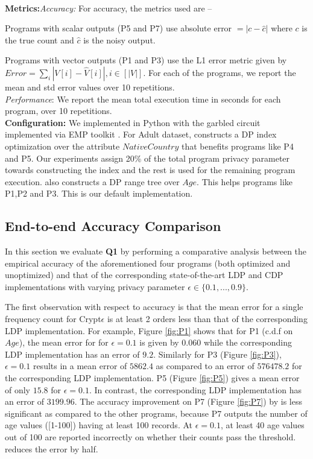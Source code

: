\\\textbf{Metrics:}\textit{Accuracy:} For accuracy, the  metrics used are --
\squishlist \item Programs with scalar outputs (P5 and P7) use absolute error $ =|c-\hat{c}|$ where $c$ is the true count and $\hat{c}$ is the noisy output.\item Programs with vector outputs (P1 and P3) use the L1 error metric given  by $Error=\sum_{i}|V[i]-\hat{V}[i]|, i \in [|V|]$.
\squishend
For each of the programs, we report the mean and std error values over 10 repetitions.
\\\textit{Performance}: We report the mean total execution time in seconds for each program, over 10 repetitions.
\\\textbf{Configuration:} We implemented \system in Python with the garbled circuit implemented via EMP
toolkit \cite{EMP}. %
For Adult dataset, \system constructs a DP index optimization over
the attribute $NativeCountry$ that benefits programs like P4 and P5. Our experiments assign
20\% of the total program privacy parameter towards constructing the index
and the rest is used for the remaining program execution. \system also constructs a DP range tree over $Age$. This helps programs like P1,P2 and P3. This is our default \system implementation. 
\subsection{End-to-end Accuracy Comparison}
In this section we evaluate \textbf{Q1} by performing a comparative analysis between the empirical accuracy of the aforementioned four \system programs (both optimized and unoptimized) and that of the corresponding state-of-the-art \textsf{LDP} \cite{LDP1} and \textsf{CDP} \cite{Dork} implementations  with varying privacy parameter $\epsilon \in \{0.1,...,0.9\}$. %

The first observation with respect to accuracy is that the mean error for a single frequency count for Crypt$\epsilon$ is at least 2 orders less than that of the corresponding \textsf{LDP} implementation.   For example, Figure \ref{fig:P1} shows that for P1 (c.d.f on $Age$), the mean error for \system for $\epsilon=0.1$ is given by $0.060$ while the corresponding \textsf{LDP} implementation has an error of $9.2$. Similarly for P3 (Figure \ref{fig:P3}),  $\epsilon=0.1$ results in a mean error of $5862.4$ as compared to an error of $576478.2$ for the corresponding \textsf{LDP} implementation. P5 (Figure \ref{fig:P5}) gives a mean error of only $15.8$ for $\epsilon=0.1$. In contrast, the corresponding \textsf{LDP} implementation has an error of $3199.96$.   The accuracy improvement on P7 (Figure \ref{fig:P7}) by \system is less significant as compared to the other programs, because P7 outputs the number of age values ([1-100]) having at least 100 records. At $\epsilon=0.1$, at least 40 age values out of 100 are
reported incorrectly on whether their counts pass the threshold. \system reduces the error by half. 

